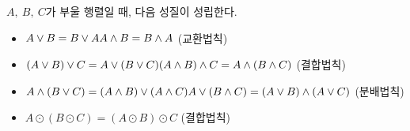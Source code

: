\begin{tcolorbox}[colback = white, colframe = Theorem, title = \textmd{정의: 부울곱}]
    $A, \ B, \ C$가 부울 행렬일 때, 다음 성질이 성립한다.
    \begin{itemize}
        \item $A \vee B = B \vee A \\ A \wedge B = B \wedge A  $ (교환법칙)
        \item $(A \vee B ) \vee C = A \vee (B\vee C) \\ (A \wedge B ) \wedge C = A \wedge (B\wedge C)$ (결합법칙)
        \item $A \wedge (B\vee C) = (A \wedge B) \vee (A \wedge C) \\ A \vee (B\wedge C) = (A \vee B) \wedge (A \vee C) $ (분배법칙)
        \item $A \odot (B \odot C)= (A \odot B) \odot C$ (결합법칙)
    \end{itemize}
\end{tcolorbox}

